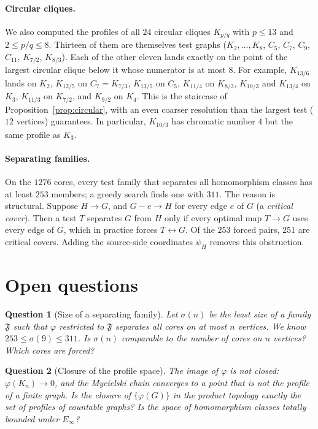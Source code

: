\documentclass{article}
\newtheorem{question}{Question}
\begin{document}
\paragraph{Circular cliques.}
We also computed the profiles of all $24$ circular cliques $K_{p/q}$ with
$p\le13$ and $2\le p/q\le8$.  Thirteen of them are themselves test graphs
($K_2,\dots,K_8$, $C_5$, $C_7$, $C_9$, $C_{11}$, $K_{7/2}$, $K_{8/3}$).
Each of the other eleven lands exactly on the point of the largest circular
clique below it whose numerator is at most $8$.  For example, $K_{13/6}$ lands on
$K_2$, $K_{12/5}$ on $C_7=K_{7/3}$, $K_{13/5}$ on $C_5$, $K_{11/4}$ on
$K_{8/3}$, $K_{10/3}$ and $K_{13/4}$ on $K_3$, $K_{11/3}$ on $K_{7/2}$, and
$K_{9/2}$ on $K_4$.  This is the staircase of
Proposition~\ref{prop:circular}, with an even coarser resolution than the
largest test ($12$ vertices) guarantees.  In particular, $K_{10/3}$ has
chromatic number $4$ but the same profile as $K_3$.

\paragraph{Separating families.}
On the $1276$ cores, every test family that separates all homomorphism
classes has at least $253$ members; a greedy search finds one with $311$.
The reason is structural.  Suppose $H\to G$, and $G-e\to H$ for every edge
$e$ of $G$ (a \emph{critical cover}).  Then a test $T$ separates $G$ from
$H$ only if every optimal map $T\to G$ uses every edge of $G$, which in
practice forces $T\leftrightarrow G$.  Of the $253$ forced pairs, $251$
are critical covers.  Adding the source-side coordinates $\psi_H$ removes
this obstruction.

\section{Open questions}

\begin{question}[Size of a separating family]
Let $\sigma(n)$ be the least size of a family $\mathfrak F$ such that
$\varphi$ restricted to $\mathfrak F$ separates all cores on at most $n$
vertices.  We know $253\le\sigma(9)\le311$.  Is $\sigma(n)$ comparable to
the number of cores on $n$ vertices?  Which cores are forced?
\end{question}

\begin{question}[Closure of the profile space]
The image of $\varphi$ is not closed: $\varphi(K_n)\to0$, and the Mycielski
chain converges to a point that is not the profile of a finite graph.  Is
the closure of $\{\varphi(G)\}$ in the product topology exactly the set of
profiles of countable graphs?  Is the space of homomorphism classes totally
bounded under $E_\infty$?
\end{question}
\end{document}

